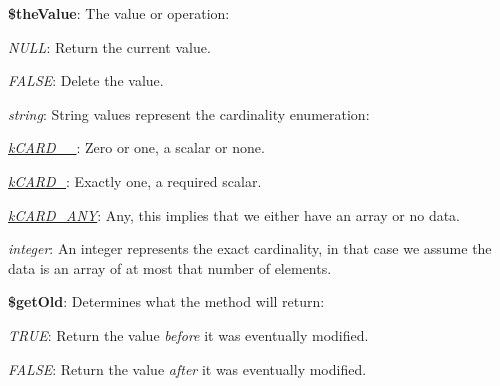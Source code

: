 \begin{DoxyItemize}
\item {\bfseries \$the\-Value}\-: The value or operation\-: 
\begin{DoxyItemize}
\item {\itshape N\-U\-L\-L}\-: Return the current value. 
\item {\itshape F\-A\-L\-S\-E}\-: Delete the value. 
\item {\itshape string}\-: String values represent the cardinality enumeration\-: 
\begin{DoxyItemize}
\item {\itshape \hyperlink{}{k\-C\-A\-R\-D\-\_\-\_}}\-: Zero or one, a scalar or none. 
\item {\itshape \hyperlink{}{k\-C\-A\-R\-D\-\_}}\-: Exactly one, a required scalar. 
\item {\itshape \hyperlink{}{k\-C\-A\-R\-D\-\_\-\-A\-N\-Y}}\-: Any, this implies that we either have an array or no data. 
\end{DoxyItemize}
\item {\itshape integer}\-: An integer represents the exact cardinality, in that case we assume the data is an array of at most that number of elements. 
\end{DoxyItemize}
\item {\bfseries \$get\-Old}\-: Determines what the method will return\-: 
\begin{DoxyItemize}
\item {\itshape T\-R\-U\-E}\-: Return the value {\itshape before} it was eventually modified. 
\item {\itshape F\-A\-L\-S\-E}\-: Return the value {\itshape after} it was eventually modified. 
\end{DoxyItemize}
\end{DoxyItemize}


